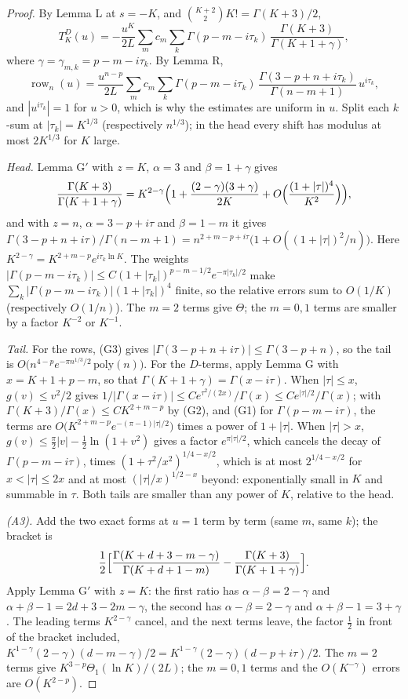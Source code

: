 \documentclass[11pt]{article}
\newcommand{\row}{\operatorname{row}}
\begin{document}
\begin{proof}
By Lemma L at $s=-K$, and $\binom{K+2}{2}K!=\Gamma(K+3)/2$,
\[
T^D_K(u)=-\frac{u^K}{2L}\sum_mc_m\sum_k\Gamma(p-m-i\tau_k)\,\frac{\Gamma(K+3)}{\Gamma(K+1+\gamma)},
\]
where $\gamma=\gamma_{m,k}=p-m-i\tau_k$. By Lemma R,
\[
\row_n(u)=\frac{u^{n-p}}{2L}\sum_mc_m\sum_k\Gamma(p-m-i\tau_k)\,\frac{\Gamma(3-p+n+i\tau_k)}{\Gamma(n-m+1)}\,u^{i\tau_k},
\]
and $|u^{i\tau_k}|=1$ for $u>0$, which is why the estimates are uniform in $u$. Split each $k$-sum at $|\tau_k|=K^{1/3}$ (respectively $n^{1/3}$); in the head every shift has modulus at most $2K^{1/3}$ for $K$ large.

\emph{Head.} Lemma G$'$ with $z=K$, $\alpha=3$ and $\beta=1+\gamma$ gives
\[
\frac{\Gamma(K+3)}{\Gamma(K+1+\gamma)}=K^{2-\gamma}\Bigl(1+\frac{(2-\gamma)(3+\gamma)}{2K}+O\Bigl(\frac{(1+|\tau|)^4}{K^2}\Bigr)\Bigr),
\]
and with $z=n$, $\alpha=3-p+i\tau$ and $\beta=1-m$ it gives $\Gamma(3-p+n+i\tau)/\Gamma(n-m+1)=n^{2+m-p+i\tau}\bigl(1+O((1+|\tau|)^2/n)\bigr)$. Here $K^{2-\gamma}=K^{2+m-p}e^{i\tau_k\ln K}$. The weights $|\Gamma(p-m-i\tau_k)|\le C(1+|\tau_k|)^{p-m-1/2}e^{-\pi|\tau_k|/2}$ make $\sum_k|\Gamma(p-m-i\tau_k)|(1+|\tau_k|)^4$ finite, so the relative errors sum to $O(1/K)$ (respectively $O(1/n)$). The $m=2$ terms give $\Theta$; the $m=0,1$ terms are smaller by a factor $K^{-2}$ or $K^{-1}$.

\emph{Tail.} For the rows, (G3) gives $|\Gamma(3-p+n+i\tau)|\le\Gamma(3-p+n)$, so the tail is $O\bigl(n^{4-p}e^{-\pi n^{1/3}/2}\,\mathrm{poly}(n)\bigr)$. For the $D$-terms, apply Lemma G with $x=K+1+p-m$, so that $\Gamma(K+1+\gamma)=\Gamma(x-i\tau)$. When $|\tau|\le x$, $g(v)\le v^2/2$ gives $1/|\Gamma(x-i\tau)|\le Ce^{\tau^2/(2x)}/\Gamma(x)\le Ce^{|\tau|/2}/\Gamma(x)$; with $\Gamma(K+3)/\Gamma(x)\le CK^{2+m-p}$ by (G2), and (G1) for $\Gamma(p-m-i\tau)$, the terms are $O\bigl(K^{2+m-p}e^{-(\pi-1)|\tau|/2}\bigr)$ times a power of $1+|\tau|$. When $|\tau|>x$, $g(v)\le\frac\pi2|v|-\frac12\ln(1+v^2)$ gives a factor $e^{\pi|\tau|/2}$, which cancels the decay of $\Gamma(p-m-i\tau)$, times $(1+\tau^2/x^2)^{1/4-x/2}$, which is at most $2^{1/4-x/2}$ for $x<|\tau|\le2x$ and at most $(|\tau|/x)^{1/2-x}$ beyond: exponentially small in $K$ and summable in $\tau$. Both tails are smaller than any power of $K$, relative to the head.

\emph{(A3).} Add the two exact forms at $u=1$ term by term (same $m$, same $k$); the bracket is
\[
\frac12\Bigl[\frac{\Gamma(K+d+3-m-\gamma)}{\Gamma(K+d+1-m)}-\frac{\Gamma(K+3)}{\Gamma(K+1+\gamma)}\Bigr].
\]
Apply Lemma G$'$ with $z=K$: the first ratio has $\alpha-\beta=2-\gamma$ and $\alpha+\beta-1=2d+3-2m-\gamma$, the second has $\alpha-\beta=2-\gamma$ and $\alpha+\beta-1=3+\gamma$. The leading terms $K^{2-\gamma}$ cancel, and the next terms leave, the factor $\frac12$ in front of the bracket included, $K^{1-\gamma}(2-\gamma)(d-m-\gamma)/2=K^{1-\gamma}(2-\gamma)(d-p+i\tau)/2$. The $m=2$ terms give $K^{3-p}\Theta_1(\ln K)/(2L)$; the $m=0,1$ terms and the $O(K^{-\gamma})$ errors are $O(K^{2-p})$.
\end{proof}
\end{document}
